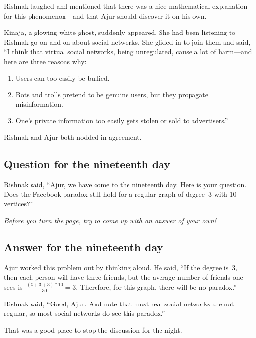 Rishnak laughed and mentioned that there was a nice mathematical explanation for this phenomenon---and that Ajur should discover it on his own.

Kinaja, a glowing white ghost, suddenly appeared. She had been listening to Rishnak go on and on about social networks. She glided in to join them and said, ``I think that virtual social networks, being unregulated, cause a lot of harm---and here are three reasons why:
\begin{enumerate}
    \item Users can too easily be bullied.
    \item Bots and trolls pretend to be genuine users, but they propagate misinformation.
    \item One's private information too easily gets stolen or sold to advertisers.''
\end{enumerate}

Rishnak and Ajur both nodded in agreement.

\subsection*{Question for the nineteenth day}
Rishnak said, ``Ajur, we have come to the nineteenth day. Here is your question. Does the Facebook paradox still hold for a regular graph of degree~3 with 10 vertices?''

\textit{Before you turn the page, try to come up with an answer of your own!}

\newpage
\subsection*{Answer for the nineteenth day}
Ajur worked this problem out by thinking aloud. He said, ``If the degree is~3, then each person will have three friends, but the average number of friends one sees is~$\frac{(3+3+3)*10}{30}=3$. Therefore, for this graph, there will be no paradox.''

Rishnak said, ``Good, Ajur. And note that most real social networks are not regular, so most social networks do see this paradox.''

That was a good place to stop the discussion for the night.
